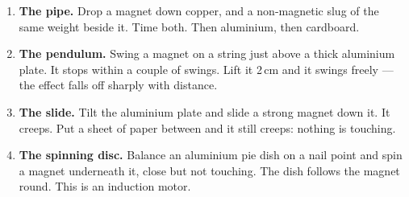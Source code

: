 \begin{enumerate}
\item \textbf{The pipe.} Drop a magnet down copper, and a non-magnetic slug of the same weight beside it. Time both. Then aluminium, then cardboard.
\item \textbf{The pendulum.} Swing a magnet on a string just above a thick aluminium plate. It stops within a couple of swings. Lift it 2\,cm and it swings freely --- the effect falls off sharply with distance.
\item \textbf{The slide.} Tilt the aluminium plate and slide a strong magnet down it. It creeps. Put a sheet of paper between and it still creeps: nothing is touching.
\item \textbf{The spinning disc.} Balance an aluminium pie dish on a nail point and spin a magnet underneath it, close but not touching. The dish follows the magnet round. This is an induction motor.
\end{enumerate}

